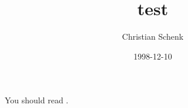 \documentclass[a4paper,10pt,notitlepage]{article}
\begin{document}
\title{test}
\author{Christian Schenk}
\date{1998-12-10}
You should read \cite{kn:c}.


\end{document}
